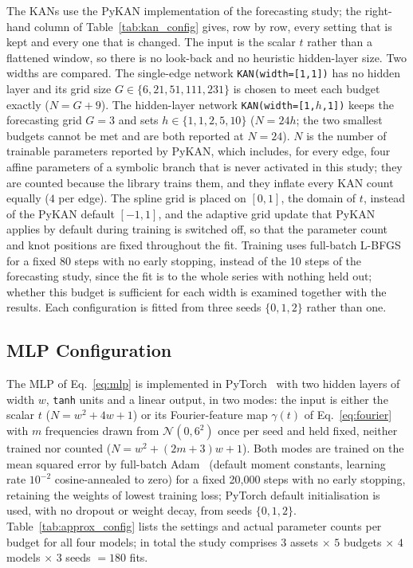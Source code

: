 {The KANs use the PyKAN implementation of the forecasting study; the
right-hand column of Table~\ref{tab:kan_config} gives, row by row,
every setting that is kept and every one that is changed. The input is
the scalar \(t\) rather than a flattened window, so there is no
look-back and no heuristic hidden-layer size. Two widths are compared.
The single-edge network \texttt{KAN(width=[1,1])} has no hidden layer
and its grid size \(G\in\{6,21,51,111,231\}\) is chosen to meet each
budget exactly (\(N=G+9\)). The hidden-layer network
\texttt{KAN(width=[1,\(h\),1])} keeps the forecasting grid \(G=3\) and
sets \(h\in\{1,1,2,5,10\}\) (\(N=24h\); the two smallest budgets cannot
be met and are both reported at \(N=24\)).
\(N\) is the number of trainable parameters reported by PyKAN, which
includes, for every edge, four affine parameters of a symbolic branch
that is never activated in this study; they are counted because the
library trains them, and they inflate every KAN count equally
(\(4\) per edge). The spline grid is placed on \([0,1]\), the domain of
\(t\), instead of the PyKAN default \([-1,1]\), and the adaptive grid
update that PyKAN applies by default during training is switched off,
so that the parameter count and knot positions are fixed throughout the
fit. Training uses full-batch L-BFGS for a fixed 80 steps with no
early stopping, instead of the 10 steps of the forecasting study,
since the fit is to the whole series with nothing held out; whether
this budget is sufficient for each width is examined together with the
results. Each configuration is fitted from three seeds \(\{0,1,2\}\)
rather than one.

\subsection{MLP Configuration}
\label{approx_mlp}

The MLP of Eq.~\eqref{eq:mlp} is implemented in
PyTorch~\cite{paszke2019pytorch} with two hidden layers of width \(w\),
\texttt{tanh} units and a linear output, in two modes: the input is
either the scalar \(t\) (\(N=w^2+4w+1\)) or its Fourier-feature map
\(\gamma(t)\) of Eq.~\eqref{eq:fourier} with \(m\) frequencies drawn
from \(\mathcal{N}(0,6^2)\) once per seed and held fixed, neither
trained nor counted (\(N=w^2+(2m+3)w+1\)). Both modes are trained on
the mean squared error by full-batch Adam~\cite{kingma2015adam}
(default moment constants, learning rate \(10^{-2}\) cosine-annealed to
zero) for a fixed 20{,}000 steps with no early stopping, retaining the
weights of lowest training loss; PyTorch default initialisation is
used, with no dropout or weight decay, from seeds \(\{0,1,2\}\).
Table~\ref{tab:approx_config} lists the settings and actual parameter
counts per budget for all four models; in total the study comprises
\(3\) assets \(\times\) \(5\) budgets \(\times\) \(4\) models
\(\times\) \(3\) seeds \(=180\) fits.

}
